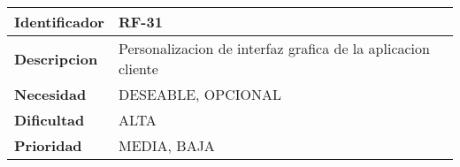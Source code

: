 \begin{center}
    \begin{tabular}{|p{2.6cm}|p{12cm}|}
    \hline
    \textbf{Identificador} & RF-31\\
    \hline
    \textbf{Descripcion} & Personalizacion de interfaz grafica de la aplicacion cliente\\
    \hline
    \textbf{Necesidad} & DESEABLE, OPCIONAL\\
    \hline
    \textbf{Dificultad} & ALTA\\
    \hline
    \textbf{Prioridad} & MEDIA, BAJA\\
    \hline
    \end{tabular}
\end{center}
